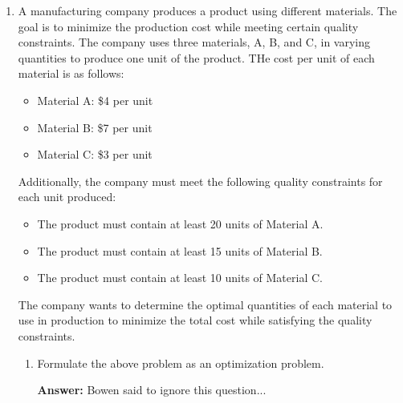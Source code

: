 \documentclass{assignment}
\begin{document}
\begin{problem}
\begin{enumerate}
\begin{enumerate}[label=(\alph*)]
\begin{enumerate}[label=\roman*.]

        \end{enumerate}
    \end{enumerate}


    \item A manufacturing company produces a product using different materials. The goal is to minimize the production cost while meeting certain quality constraints. The company uses three materials, A, B, and C, in varying quantities to produce one unit of the product. THe cost per unit of each material is as follows:

        \begin{itemize}
            \item Material A: \$4 per unit
            \item Material B: \$7 per unit
            \item Material C: \$3 per unit
        \end{itemize}

    Additionally, the company must meet the following quality constraints for each unit produced:

        \begin{itemize}
            \item The product must contain at least 20 units of Material A.
            \item The product must contain at least 15 units of Material B.
            \item The product must contain at least 10 units of Material C.
        \end{itemize}

    The company wants to determine the optimal quantities of each material to use in production to minimize the total cost while satisfying the quality constraints.
    
    \begin{enumerate}[label=(\alph*)]

    
        \item Formulate the above problem as an optimization problem.

        \color{red}\textbf{Answer:} Bowen said to ignore this question...\color{black}


\end{enumerate}
\end{enumerate}
\end{problem}
\end{document}
